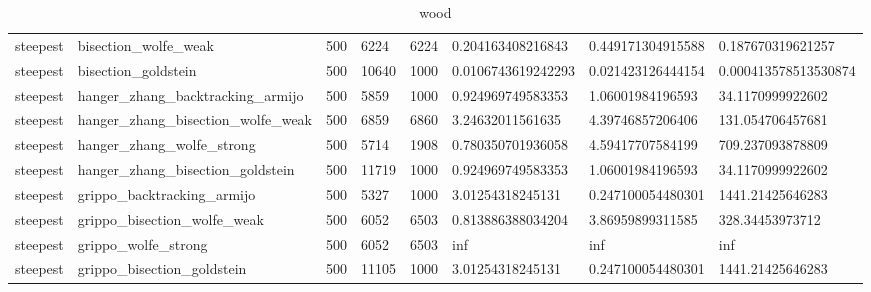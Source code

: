 \documentclass[a4paper,11pt]{article}
\numberwithin{equation}{section} %
\begin{document}
\begin{table}[h!]
{\begin{tabular}{|l|l|l|l|l|l|l|l|}
        steepest & bisection\_wolfe\_weak & 500 & 6224 & 6224 & 0.204163408216843 & 0.449171304915588 & 0.187670319621257 \\
        steepest & bisection\_goldstein & 500 & 10640 & 1000 & 0.0106743619242293 & 0.021423126444154 & 0.000413578513530874 \\
        steepest & hanger\_zhang\_backtracking\_armijo & 500 & 5859 & 1000 & 0.924969749583353 & 1.06001984196593 & 34.1170999922602 \\
        steepest & hanger\_zhang\_bisection\_wolfe\_weak & 500 & 6859 & 6860 & 3.24632011561635 & 4.39746857206406 & 131.054706457681 \\
        steepest & hanger\_zhang\_wolfe\_strong & 500 & 5714 & 1908 & 0.780350701936058 & 4.59417707584199 & 709.237093878809 \\
        steepest & hanger\_zhang\_bisection\_goldstein & 500 & 11719 & 1000 & 0.924969749583353 & 1.06001984196593 & 34.1170999922602 \\
        steepest & grippo\_backtracking\_armijo & 500 & 5327 & 1000 & 3.01254318245131 & 0.247100054480301 & 1441.21425646283 \\
        steepest & grippo\_bisection\_wolfe\_weak & 500 & 6052 & 6503 & 0.813886388034204 & 3.86959899311585 & 328.34453973712 \\
        steepest & grippo\_wolfe\_strong & 500 & 6052 & 6503 & inf & inf & inf \\
        steepest & grippo\_bisection\_goldstein & 500 & 11105 & 1000 & 3.01254318245131 & 0.247100054480301 & 1441.21425646283 \\
\end{tabular}}
\caption{wood}
\label{table:wood}
\end{table}
\end{document}

